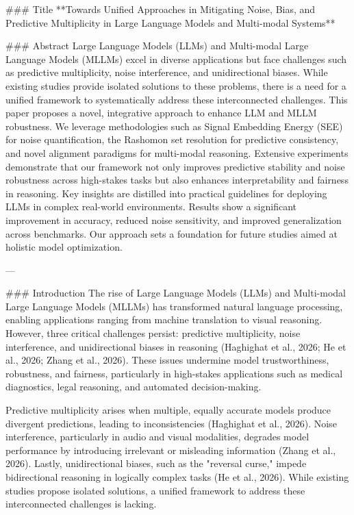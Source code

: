 ### Title
**Towards Unified Approaches in Mitigating Noise, Bias, and Predictive Multiplicity in Large Language Models and Multi-modal Systems**

### Abstract
Large Language Models (LLMs) and Multi-modal Large Language Models (MLLMs) excel in diverse applications but face challenges such as predictive multiplicity, noise interference, and unidirectional biases. While existing studies provide isolated solutions to these problems, there is a need for a unified framework to systematically address these interconnected challenges. This paper proposes a novel, integrative approach to enhance LLM and MLLM robustness. We leverage methodologies such as Signal Embedding Energy (SEE) for noise quantification, the Rashomon set resolution for predictive consistency, and novel alignment paradigms for multi-modal reasoning. Extensive experiments demonstrate that our framework not only improves predictive stability and noise robustness across high-stakes tasks but also enhances interpretability and fairness in reasoning. Key insights are distilled into practical guidelines for deploying LLMs in complex real-world environments. Results show a significant improvement in accuracy, reduced noise sensitivity, and improved generalization across benchmarks. Our approach sets a foundation for future studies aimed at holistic model optimization.

---

### Introduction
The rise of Large Language Models (LLMs) and Multi-modal Large Language Models (MLLMs) has transformed natural language processing, enabling applications ranging from machine translation to visual reasoning. However, three critical challenges persist: predictive multiplicity, noise interference, and unidirectional biases in reasoning (Haghighat et al., 2026; He et al., 2026; Zhang et al., 2026). These issues undermine model trustworthiness, robustness, and fairness, particularly in high-stakes applications such as medical diagnostics, legal reasoning, and automated decision-making.

Predictive multiplicity arises when multiple, equally accurate models produce divergent predictions, leading to inconsistencies (Haghighat et al., 2026). Noise interference, particularly in audio and visual modalities, degrades model performance by introducing irrelevant or misleading information (Zhang et al., 2026). Lastly, unidirectional biases, such as the "reversal curse," impede bidirectional reasoning in logically complex tasks (He et al., 2026). While existing studies propose isolated solutions, a unified framework to address these interconnected challenges is lacking.

